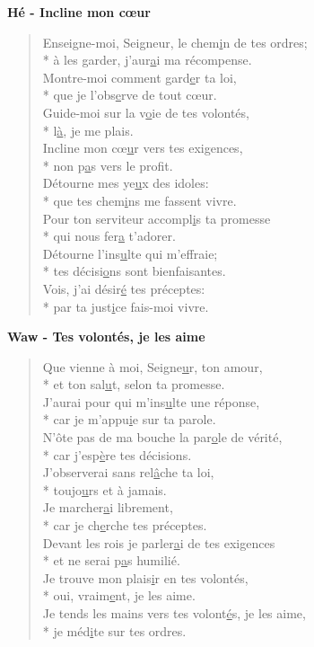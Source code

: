 \textbf{Hé - Incline mon cœur}
\begin{verse}
Enseigne-moi, Seigneur, le chem\underline{i}n de tes ordres; \\*
à les garder, j’aur\underline{a}i ma récompense. \\
Montre-moi comment gard\underline{e}r ta loi, \\*
que je l’obs\underline{e}rve de tout cœur. \\
Guide-moi sur la v\underline{o}ie de tes volontés, \\*
l\underline{à}, je me plais. \\
Incline mon cœ\underline{u}r vers tes exigences, \\*
non p\underline{a}s vers le profit. \\
Détourne mes ye\underline{u}x des idoles: \\*
que tes chem\underline{i}ns me fassent vivre. \\
Pour ton serviteur accompl\underline{i}s ta promesse \\*
qui nous fer\underline{a} t’adorer. \\
Détourne l’ins\underline{u}lte qui m’effraie; \\*
tes décisi\underline{o}ns sont bienfaisantes. \\
Vois, j’ai désir\underline{é} tes préceptes: \\*
par ta just\underline{i}ce fais-moi vivre. \\
\end{verse}
\textbf{Waw - Tes volontés, je les aime}
\begin{verse}
Que vienne à moi, Seigne\underline{u}r, ton amour, \\*
et ton sal\underline{u}t, selon ta promesse. \\
J’aurai pour qui m’ins\underline{u}lte une réponse, \\*
car je m’appu\underline{i}e sur ta parole. \\
N’ôte pas de ma bouche la par\underline{o}le de vérité, \\*
car j’esp\underline{è}re tes décisions. \\
J’observerai sans rel\underline{â}che ta loi, \\*
toujo\underline{u}rs et à jamais. \\
Je marcher\underline{a}i librement, \\*
car je ch\underline{e}rche tes préceptes. \\
Devant les rois je parler\underline{a}i de tes exigences \\*
et ne serai p\underline{a}s humilié. \\
Je trouve mon plais\underline{i}r en tes volontés, \\*
oui, vraim\underline{e}nt, je les aime. \\
Je tends les mains vers tes volont\underline{é}s, je les aime, \\*
je méd\underline{i}te sur tes ordres. \\
\end{verse}
